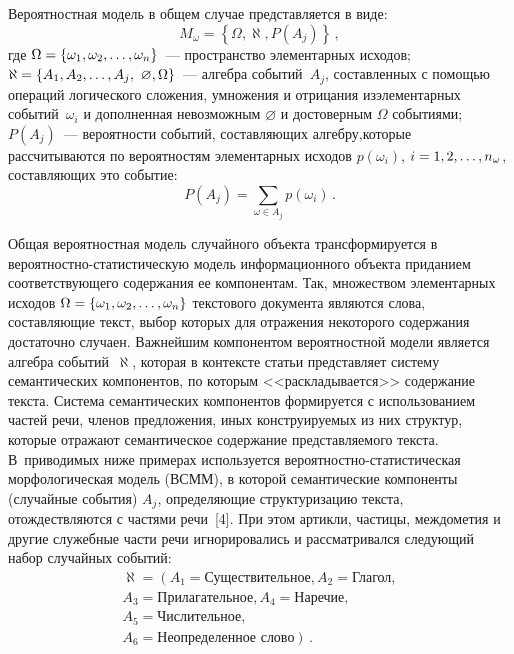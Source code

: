 \begin{multicols}{2}
     Вероятностная модель в общем случае пред\-став\-ля\-ет\-ся в виде:
     \begin{equation}
     M_\omega =\left\{ \Omega, \aleph, P(A_j)\right\}\,,
     \label{e1-kuz}
     \end{equation}
     где $\Omega\hm=\{\omega_1, \omega_2, \ldots , \omega_n\}$~--- пространство 
элементарных исходов;
     $\aleph \hm= \left\{ A_1, A_2, \ldots , A_j,\ \varnothing, \Omega\right\}$~--- 
алгебра событий~$A_j$, составленных с помощью операций логического сложения, 
умножения и отрицания из\linebreak элементарных событий~$\omega_i$ и дополненная 
невозможным $\varnothing$ и достоверным $\Omega$ событиями;
     $P(A_j)$~--- вероятности событий, составляющих алгебру,\linebreak которые 
рассчитываются по вероятностям элементарных исходов $p(\omega_i)$, $i\hm=1, 2, 
\ldots , n_\omega$, со\-став\-ля\-ющих это событие: 
     \begin{equation}
     P(A_j) =\sum\limits_{\omega\in A_j} p(\omega_i)\,.
     \label{e2-kuz}
     \end{equation}
     
     Общая вероятностная модель случайного объекта трансформируется в 
     ве\-ро\-ят\-ност\-но-ста\-ти\-стическую модель информационного объекта 
придани\-ем соответствующего содержания ее компонентам. Так, множеством 
элементарных исходов $\Omega\hm=\{\omega_1, \omega_2, \ldots , \omega_n\}$ 
текстового документа являются слова, составляющие текст, выбор которых для 
отражения некоторого содержания достаточно случаен. Важнейшим компонентом 
вероятностной модели является алгебра событий~$\aleph$, которая в контексте 
статьи представляет систему семантических компонентов, по которым 
<<раскладывается>> содержание текста. Система семантических компонентов 
формируется с использованием частей речи, членов предложения, иных 
конструируемых из них структур, которые отражают семантическое содержание 
представляемого текста. В~приводимых ниже примерах используется 
     ве\-ро\-ят\-ност\-но-ста\-ти\-сти\-че\-ская морфологическая модель (ВСММ), в 
которой семантические компоненты (случайные события) $A_j$, определяющие 
структуризацию текста, отождествляются с частями речи~[4]. При этом артикли, 
частицы, междометия и другие служебные части речи игнорировались и 
рассматривался следующий набор случайных событий: 
     \begin{multline}
\aleph = \left(A_1 = \mbox{Существительное}, A_2 = \mbox{Глагол},\right.\\
A_3 = \mbox{Прилагательное}, A_4 = \mbox{Наречие},\\
A_5 = \mbox{Числительное},\\ 
\left.A_6 = \mbox{Неопределенное слово}\right)\,.     
\label{e3-kuz}
\end{multline}


\end{multicols}
